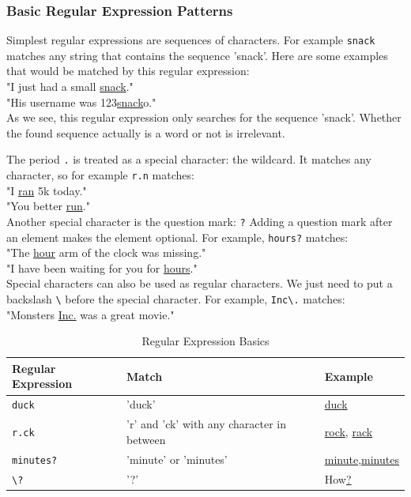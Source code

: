 \subsubsection{Basic Regular Expression Patterns}
Simplest regular expressions are sequences of characters. 
For example \texttt{snack} matches any string that contains the sequence 'snack'. 
Here are some examples that would be matched by this regular expression:\\
"I just had a small \underline{snack}."\\
"His username was 123\underline{snack}o."\\
As we see, this regular expression only searches for the sequence 'snack'.
Whether the found sequence actually is a word or not is irrelevant.

The period \texttt{.} is treated as a special character: the wildcard.
It matches any character, so for example \texttt{r.n} matches:\\
"I \underline{ran} 5k today."\\
"You better \underline{run}."\\
Another special character is the question mark: \texttt{?}
Adding a question mark after an element makes the element optional. 
For example, \texttt{hours?} matches:\\
"The \underline{hour} arm of the clock was missing."\\
"I have been waiting for you for \underline{hours}."\\
Special characters can also be used as regular characters.  
We just need to put a backslash \texttt{\textbackslash} before the special character.
For example, \texttt{Inc\textbackslash.} matches:\\
"Monsters \underline{Inc.} was a great movie."

\begin{table}[htbp]
  \caption[Regular Expression Basics]{Regular Expression Basics}\label{tab:re_basic}		
  \centering
  \begin{tabular}{l l l}
    Regular Expression&Match&Example\\ \toprule
    \texttt{duck}&'duck'&\underline{duck}\\ \hline
    \texttt{r.ck}&'r' and 'ck' with any character in between&\underline{rock}, \underline{rack}\\ \hline
    \texttt{minutes?}&'minute' or 'minutes'&\underline{minute},\underline{minutes}\\ \hline
    \texttt{\textbackslash?}&'?'&How\underline{?}\\ \hline
  \end{tabular}
\end{table}

